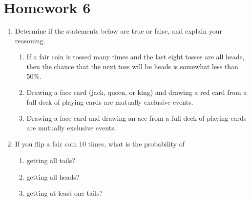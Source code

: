 \documentclass{article}\usepackage[]{graphicx}\usepackage[]{color}
\begin{document}
\section*{Homework 6}

\begin{enumerate} 

\item Determine if the statements below are true or false, and explain your reasoning.
\begin{enumerate}
\item If a fair coin is tossed many times and the last eight tosses are all heads, then the chance that the next toss will be heads is somewhat less than 50\%.
\item Drawing a face card (jack, queen, or king) and drawing a red card from a full deck of playing cards are mutually exclusive events.
\item Drawing a face card and drawing an ace from a full deck of playing cards are mutually exclusive events.
\end{enumerate}



\item If you flip a fair coin 10 times, what is the probability of
\begin{multicols}{3}
\begin{enumerate}
\item getting all tails? 
\item getting all heads? 
\item getting at least one tails? 
\end{enumerate}
\end{multicols}




\end{enumerate}
\end{document}
